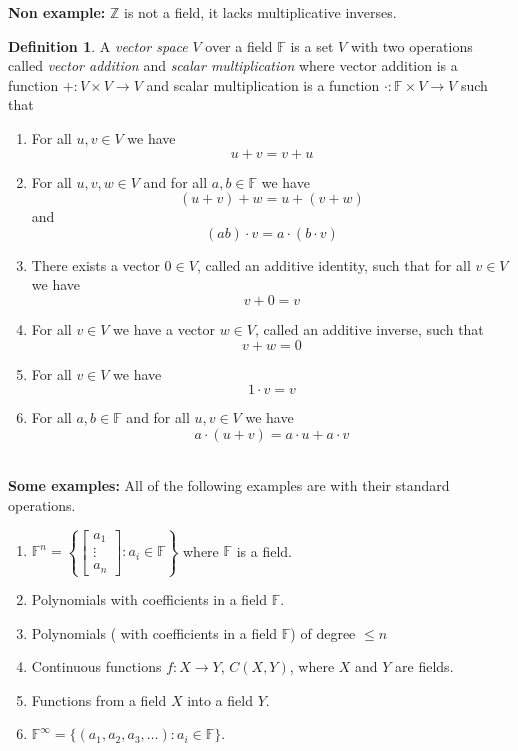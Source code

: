 \documentclass[12pt,letterpaper]{article}
\theoremstyle{plain}
\theoremstyle{definition}
\newtheorem{definition}[theorem]{Definition}
\numberwithin{equation}{section}
\begin{document}
{\bf\noindent Non example: }$\mathbb{Z}$ is not a field, it lacks multiplicative inverses. 

\begin{definition} A \emph{vector space} $V$ over a field $\mathbb{F}$ is a set $V$ with two operations called \emph{vector addition} and \emph{scalar multiplication} where vector addition is a function $+:V\times V\rightarrow V$ and scalar multiplication is a function $\cdot: \mathbb{F}\times V\rightarrow V$ such that 
\\
\begin{enumerate}[1.] 
\setlength{\itemsep}{5pt}
\item For all $u,v\in V$ we have 
\[u+v=v+u\]
\item For all $u,v,w\in V$ and for all $a,b\in\mathbb{F}$ we have 
\[(u+v)+w=u+(v+w)\]
and 
\[(ab)\cdot v=a\cdot(b\cdot v)\]
\item There exists a vector $0\in V$, called an additive identity, such that for all $v\in V$ we have
\[v+0=v\]

\item For all $v\in V$ we have a vector $w\in V$, called an additive inverse, such that 
\[v+w=0\]
\item For all $v\in V$ we have 
\[1\cdot v=v\]
\item For all $a,b \in \mathbb{F}$ and for all $u,v\in V$ we have
\[a\cdot(u+v)=a\cdot u+a\cdot v\] 
\end{enumerate}
\end{definition}
\ \\
{\bf \noindent Some examples:} All of the following examples are with their standard operations. 
\begin{enumerate}[1.]
\setlength{\itemsep}{5pt}
\item $\mathbb{F}^n=\left\{\begin{bmatrix}a_1\\ \vdots \\ a_n\end{bmatrix}: a_i\in \mathbb{F}\right\}$ where $\mathbb{F}$ is a field. 
\item Polynomials with coefficients in a field $\mathbb{F}$.
\item Polynomials ( with coefficients in a field $\mathbb{F}$) of degree $\leq n$
\item Continuous functions $f:X\rightarrow Y$, $C(X,Y)$, where $X$ and $Y$ are fields. 
\item Functions from a field $X$ into a field $Y$. 
\item $\mathbb{F}^\infty=\{(a_1, a_2, a_3, \ldots): a_i\in \mathbb{F}\}$. 
\end{enumerate}
\end{document}
